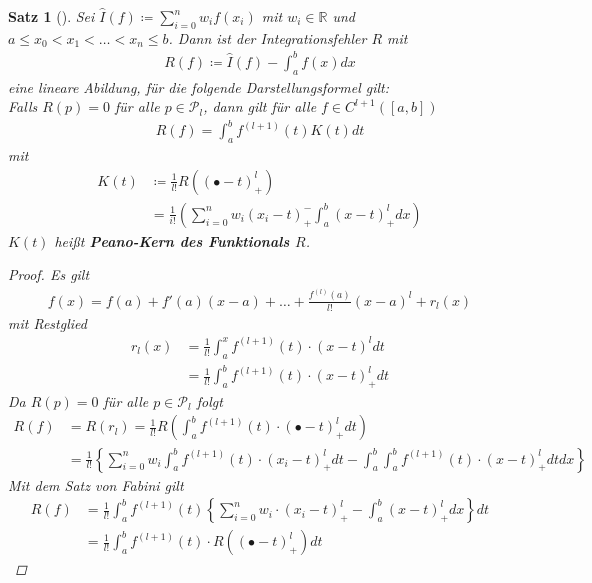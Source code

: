 \documentclass[ngerman,fontsize=11pt, paper=a4, parskip=half, titlepage=true, toc=bib]{scrbook}
\theoremstyle{definition}
\theoremstyle{plain}
\newtheorem{Satz}[Def]{Satz}		%
\newcommand{\R}{\mathds{R}}
\newenvironment{Satze}[1][]{ %
  \begin{Satz}[#1]  }
  { \end{Satz}
  \addtocounter{subsection}{1}}
\begin{document}
\begin{Satze}
  Sei $\hat{I}(f)\coloneqq \sum_{i=0}^n w_if(x_i)$ mit $w_i\in\R$ und
  $a\leq x_0<x_1<\ldots <x_n\leq b$.
  Dann ist der Integrationsfehler $R$ mit 
  \begin{gather}
    R(f) \coloneqq \hat{I}(f) - \int_a^b f(x) dx
    \label{VII.2.5}
  \end{gather}
  eine lineare Abildung, für die folgende Darstellungsformel gilt:
  \\
  Falls $R(p)=0$ für alle $p\in\mathcal{P}_l$, dann gilt 
  für alle $f\in C^{l+1}([a,b])$
  \begin{gather}
    R(f) = \int_a^bf^{(l+1)}(t) K(t) dt
    \label{VII.2.6}
  \end{gather}
  mit 
  \begin{align}\nonumber
    K(t) &\coloneqq \frac{1}{l!}
           R\left( 
           (\bullet -t)_+^l
           \right)\\
         &= \frac{1}{i!}\left( \sum_{i=0}^n w_i(x_i-t)_+^-\int_a^b(x-t)_+^ldx  \right)
           \label{VII.2.7}
  \end{align}
  $K(t)$ heißt \textbf{Peano-Kern des Funktionals
    $R$}.
  \begin{proof}
    Es gilt
    \begin{gather*}
      f(x) = f(a) + f'(a)(x-a) +\ldots + \frac{f^{(l)}(a)}{l!}(x-a)^l + r_l(x)
    \end{gather*}
    mit Restglied 
    \begin{align*}
      r_l(x) &= \frac{1}{l!} \int_a^xf^{(l+1)} (t)\cdot (x-t)^l dt\\
             &= \frac{1}{l!} \int_a^bf^{(l+1)} (t)\cdot (x-t)_+^l dt
    \end{align*}
    Da $R(p)=0$ für alle $p\in\mathcal{P}_l$ folgt
    \begin{align*}
      R(f) &= R(r_l)
             = \frac{1}{l!} R\left(\int_a^bf^{(l+1)} (t)\cdot(\bullet-t)_+^l
             dt\right)\\
           &=\frac{1}{l!}\left\{ \sum_{i=0}^n w_i \int_a^b f^{(l+1)}(t)
             \cdot (x_i-t)_+^ldt  
             - \int_a^b\int_a^b  f^{(l+1)}(t) \cdot (x-t)_+^ldtdx  \right\}
    \end{align*}
    Mit dem Satz von Fabini gilt
    \begin{align*}
      R(f) &= \frac{1}{l!}\int_a^bf^{(l+1)}(t) 
             \left\{ 
             \sum_{i=0}^n w_i  \cdot (x_i-t)_+^l  
             - \int_a^b(x-t)_+^ldx  \right\}
             dt\\
           &= \frac{1}{l!} \int_a^bf^{(l+1)}(t) 
             \cdot R\left( (\bullet -t)_+^l\right) dt    
    \end{align*}
  \end{proof}
\end{Satze}
\end{document}
